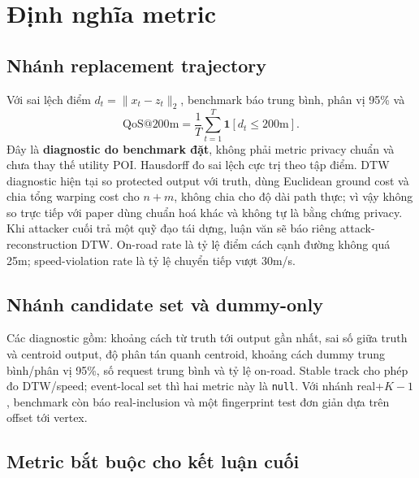 \documentclass[12pt,a4paper,oneside]{report}
\begin{document}
\section{Định nghĩa metric}

\subsection{Nhánh replacement trajectory}

Với sai lệch điểm $d_t=\|x_t-z_t\|_2$, benchmark báo trung bình, phân vị 95\% và
\[
\mathrm{QoS@200m}=\frac{1}{T}\sum_{t=1}^{T}\mathbf 1[d_t\le 200\mathrm{m}].
\]
Đây là \textbf{diagnostic do benchmark đặt}, không phải metric privacy chuẩn và chưa thay thế utility POI. Hausdorff đo sai lệch cực trị theo tập điểm. DTW diagnostic hiện tại so protected output với truth, dùng Euclidean ground cost và chia tổng warping cost cho $n+m$, không chia cho độ dài path thực; vì vậy không so trực tiếp với paper dùng chuẩn hoá khác và không tự là bằng chứng privacy. Khi attacker cuối trả một quỹ đạo tái dựng, luận văn sẽ báo riêng attack-reconstruction DTW. On-road rate là tỷ lệ điểm cách cạnh đường không quá 25m; speed-violation rate là tỷ lệ chuyển tiếp vượt 30m/s.

\subsection{Nhánh candidate set và dummy-only}

Các diagnostic gồm: khoảng cách từ truth tới output gần nhất, sai số giữa truth và centroid output, độ phân tán quanh centroid, khoảng cách dummy trung bình/phân vị 95\%, số request trung bình và tỷ lệ on-road. Stable track cho phép đo DTW/speed; event-local set thì hai metric này là \texttt{null}. Với nhánh real+$K-1$, benchmark còn báo real-inclusion và một fingerprint test đơn giản dựa trên offset tới vertex.

\subsection{Metric bắt buộc cho kết luận cuối}
\end{document}
